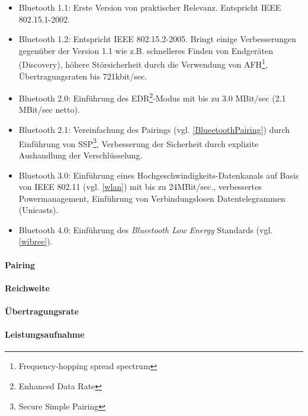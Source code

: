             \begin{itemize}
                \item{Bluetooth 1.1:} Erste Version von praktischer Relevanz. Entspricht 
                                      IEEE 802.15.1-2002.
                \item{Bluetooth 1.2:} Entspricht IEEE 802.15.2-2005. Bringt einige Verbesserungen
                                      gegenüber der Version 1.1 wie z.B. schnelleres Finden
                                      von Endgeräten (Discovery), höhere Störsicherheit durch
                                      die Verwendung von AFH\footnote{Frequency-hopping spread spectrum},
                                      Übertragungsraten bis 721kbit/sec.
                \item{Bluetooth 2.0:} Einführung des EDR\footnote{Enhanced Data Rate}-Modus mit bis zu
                                      3.0 MBit/sec (2.1 MBit/sec netto).
                \item{Bluetooth 2.1:} Vereinfachung des Pairings (vgl. \ref{BlueetoothPairing}) durch 
                                      Einführung von SSP\footnote{Secure Simple Pairing}, Verbesserung
                                      der Sicherheit durch explizite Aushandlung der Verschlüsselung.
                \item{Bluetooth 3.0:} Einführung eines Hochgeschwindigkeits-Datenkanals auf Basis von
                                      IEEE 802.11 (vgl. \ref{wlan}) mit bis zu 24MBit/sec., verbessertes
                                      Powermanagement, Einführung von Verbindungslosen Datentelegrammen
                                      (Unicasts).
                \item{Bluetooth 4.0:} Einführung des \textsl{Blueetooth Low Energy} Standards (vgl. \ref{wibree}).
            \end{itemize}

        \paragraph{Pairing}\label{BluetoothPairing}
        \paragraph{Reichweite}
        \paragraph{Übertragungsrate}
        \paragraph{Leistungsaufnahme}
